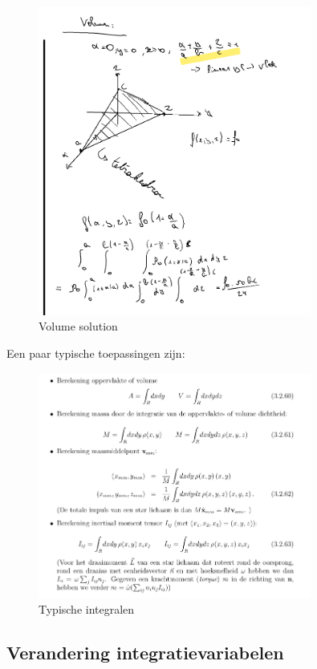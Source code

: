 \documentclass[a4paper]{report}
\begin{document}
\begin{figure}[H]
	\centering
	\includegraphics[width=0.8\textwidth]{assets/volume_sol.png}
	\caption{Volume solution}
	\label{fig:volume_sol}
\end{figure}

Een paar typische toepassingen zijn:


\begin{figure}[H]
	\centering
	\includegraphics[width=0.8\textwidth]{assets/typische_integralen.png}
	\caption{Typische integralen}
	\label{fig:typische_integralen}
\end{figure}

\subsection{Verandering integratievariabelen}
\end{document}
